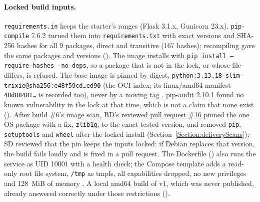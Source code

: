 \paragraph{Locked build inputs.} \texttt{requirements.in} keeps the starter's ranges (Flask 3.1.x, Gunicorn 23.x). \texttt{pip-compile} 7.6.2 turned them into \texttt{requirements.txt} with exact versions and SHA-256 hashes for all 9 packages, direct and transitive (167 hashes);
recompiling gave the same packages and versions (). The image installs with \texttt{pip install --require-hashes --no-deps}, so a package that is not in the lock, or whose file differs, is refused.
The base image is pinned by digest, \texttt{python:3.13.18-slim-trixie@sha256:e48f59cd\ldots ed90} (the OCI index; its linux/amd64 manifest \texttt{48d88481\ldots} is recorded too), never by a moving tag \cite{DockerBuildBestPractices}.
pip-audit 2.10.1 found no known vulnerability in the lock at that time, which is not a claim that none exist (). After build \#6's image scan, BD's reviewed \href{\GiteaRepoURL/pulls/16}{pull request \#16} pinned the one OS package with a fix, \texttt{zlib1g}, to the exact tested version,
and removed \texttt{pip}, \texttt{setuptools} and \texttt{wheel} after the locked install (Section~\ref{Section:deliveryScans}); SD reviewed that the pin keeps the inputs locked: if Debian replaces that version, the build fails loudly and is fixed in a pull request.
The Dockerfile () also runs the service as UID 10001 with a health check; the Compose template adds a read-only root file system, \texttt{/tmp} as tmpfs, all capabilities dropped, no new privileges and 128~MiB of memory
\cite{DockerEngineSecurity,FlaskDeploying}. A local amd64 build of v1, which was never published, already answered correctly under those restrictions ().

\begin{longlisting}
\inputminted[fontsize=\scriptsize]{python}{config/twintrack/pricing-service/app.py}
\caption{\texttt{pricing-service/app.py} on \texttt{main} (v2; v1 differs only in \texttt{VERSION = "v1"} and \texttt{UNIT\_PRICE = 10}).}
\label{Listing:EDeliveryApp}
\end{longlisting}

\begin{longlisting}
\inputminted[fontsize=\scriptsize]{python}{config/twintrack/pricing-service/test_app.py}
\caption{\texttt{pricing-service/test\_app.py} on \texttt{main} (v2 expectations: version v2, total 36).}
\label{Listing:EDeliveryTests}
\end{longlisting}

